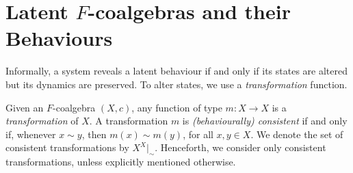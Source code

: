 \section{Latent $F$-coalgebras and their Behaviours}
Informally, a system reveals a latent behaviour if and only if its states are altered but its dynamics are preserved. To alter states, we use a \emph{transformation} function.

\begin{definition}
Given an $F$-coalgebra $(X,c)$, any function of type $m\colon X\rightarrow X$ is a \emph{transformation} of $X$. %
A transformation $m$ is \emph{(behaviourally) consistent} if and only if, whenever $x\sim y$, then $m(x)\sim m(y)$, for all $x,y \in X$. We denote the set of consistent transformations by $X^X|_\sim$. Henceforth, we consider only consistent transformations, unless explicitly mentioned otherwise.
\end{definition}


